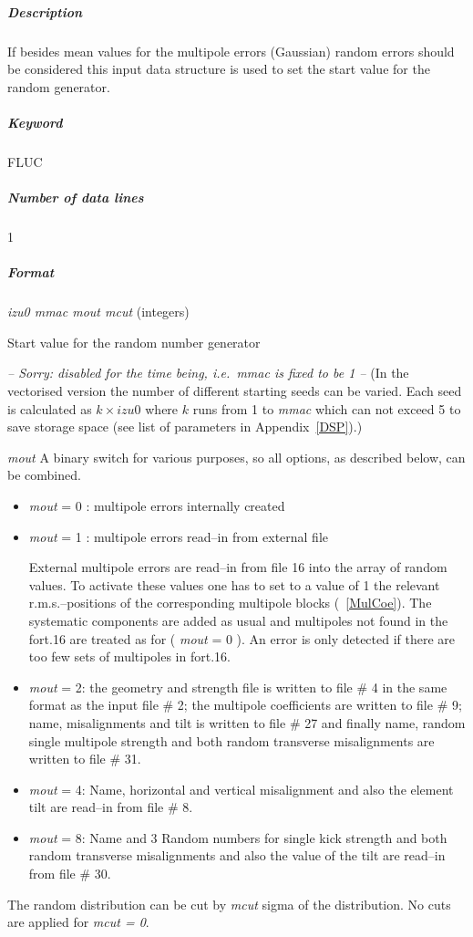 \documentclass[a4paper,11pt]{report}
\begin{document}
\subparagraph{Description} If besides mean values for the multipole
errors (Gaussian) random errors should be considered this input data
structure is used to set the start value for the random generator.

\subparagraph{Keyword} FLUC \subparagraph{Number of data lines} 1

\subparagraph{Format} {\em izu0 mmac mout mcut} \/(integers)
\begin{description}
\item [izu0] Start value for the random number generator
\item [mmac] {\em \large -- Sorry: disabled for the time being, i.e.\ 
    mmac is fixed to be 1 --} \/({\small In the vectorised version the
    number of different starting seeds can be varied.  Each seed is
    calculated as \mbox{$ k \times izu0 $} where $k$ runs from 1 to
    {\em mmac} \/which can not exceed 5 to save storage space (see
    list of parameters in Appendix~\ref{DSP}).})
\item {\em mout} A binary switch for various purposes, so all options,
  as described below, can be combined. 
\begin{itemize}
\item {\em mout} \/= 0 : multipole errors internally created
\item {\em mout} \/= 1 : multipole errors read--in from external file
  
  External multipole errors are read--in from file 16 into the array
  of random values. To activate these values one has to set to a value
  of 1 the relevant r.m.s.--positions of the corresponding multipole
  blocks (~\ref{MulCoe}). The systematic components are added as usual
  and multipoles not found in the fort.16 are treated as for ({\em
    mout} \/= 0 ). An error is only detected if there are too few sets
  of multipoles in fort.16.
\item {\em mout} \/= 2: the geometry and strength file is written to
  file \# 4 in the same format as the input file \# 2; the multipole
  coefficients are written to file \# 9; name, misalignments and tilt
  is written to file \# 27 and finally name, random single multipole
  strength and both random transverse misalignments are written to
  file \# 31.
\item {\em mout} \/= 4: Name, horizontal and vertical misalignment and
  also the element tilt are read--in from file \# 8.
\item {\em mout} \/= 8: Name and 3 Random numbers for single kick
  strength and both random transverse misalignments and also the value
  of the tilt are read--in from file \# 30. 
\end{itemize}
\item [mcut] The random distribution can be cut by {\em mcut} \/sigma
  of the distribution. No cuts are applied for {\em mcut = 0}\/.
\end{description}
\end{document}
